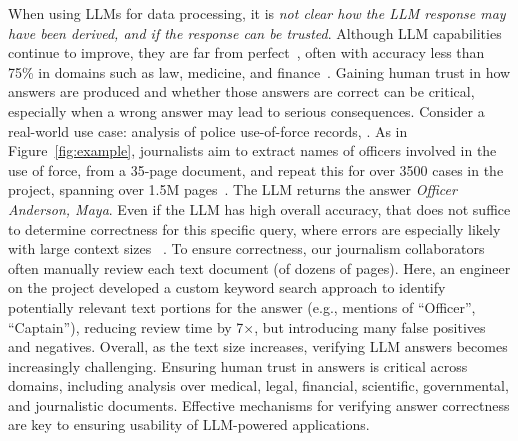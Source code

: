 When using LLMs for data processing, 
 it is {\em not clear how the LLM
response may have been derived, and if
the response can be trusted}.
Although LLM capabilities continue to improve, they are far from perfect~\cite{zhang2024benchmarking,liu2024lost}, often with accuracy less than 75\% in domains such as law, medicine, and finance~\cite{liang2023holistic, guha2023legalbench, islam2023financebench, arora2025healthbench, liu2024large}. %
Gaining human trust in how answers
are produced and whether those answers are correct can be critical, 
especially when a wrong answer may lead to serious consequences. 
Consider a real-world use case: 
analysis of police use-of-force records, 
.  
As in Figure~\ref{fig:example}, journalists aim to extract
names of officers involved in the use of force, from a 35-page document, and repeat this for 
over 3500 cases in the project, spanning over 1.5M pages~\cite{clean}.    
The LLM  returns the answer {\em Officer Anderson, Maya}. 
Even if the LLM has high overall accuracy,
that does not suffice to determine correctness for this specific query, 
where errors are especially likely
with large context sizes ~\cite{liu2024lost,bai2023longbench}. 
To ensure correctness,
our journalism collaborators 
often manually review each text document (of dozens of pages).
Here, an engineer on the project
developed a custom keyword search approach to identify potentially relevant
text portions for the answer (e.g., mentions of ``Officer'', ``Captain''), 
reducing review time by 7$\times$, but introducing many false positives and negatives. 
Overall, 
as the text size increases, 
verifying LLM answers becomes increasingly challenging. 
Ensuring human trust in answers is critical across domains, including analysis over medical, legal, financial, scientific, governmental, and journalistic documents. 
Effective mechanisms for verifying answer correctness 
are key to ensuring  usability of LLM-powered applications.  






